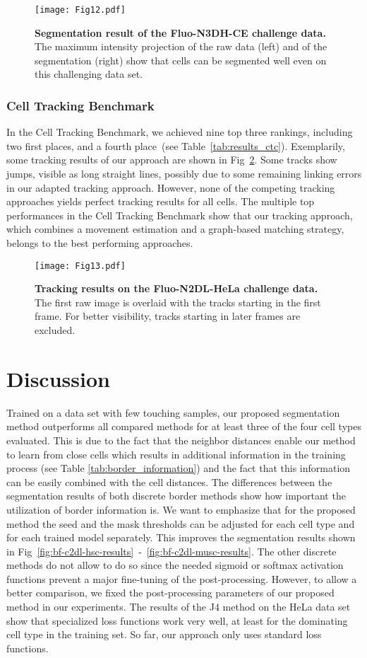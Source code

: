 \documentclass[10pt,letterpaper]{article}
\begin{document}
\begin{figure}
\centering
\texttt{[image: Fig12.pdf]}
\caption{\textbf{Segmentation result of the Fluo-N3DH-CE challenge data.} The maximum intensity projection of the raw data (left) and of the segmentation (right) show that cells can be segmented well even on this challenging data set.}
\label{fig:results-ce}
\end{figure}

\subsubsection*{Cell Tracking Benchmark}
In the Cell Tracking Benchmark, we achieved nine top three rankings, including two first places, and a fourth place~(see Table~\ref{tab:results_ctc}). Exemplarily, some tracking results of our approach are shown in Fig~\ref{fig:results-track-hela}. Some tracks show jumps, visible as long straight lines, possibly due to some remaining linking errors in our adapted tracking approach. However, none of the competing tracking approaches yields perfect tracking results for all cells. The multiple top performances in the Cell Tracking Benchmark show that our tracking approach, which combines a movement estimation and a graph-based matching strategy, belongs to the best performing approaches.
\begin{figure}
\centering
\texttt{[image: Fig13.pdf]}
\caption{\textbf{Tracking results on the Fluo-N2DL-HeLa challenge data.} The first raw image is overlaid with the tracks starting in the first frame. For better visibility, tracks starting in later frames are excluded.}
\label{fig:results-track-hela}
\end{figure}

\section*{Discussion}
Trained on a data set with few touching samples, our proposed segmentation method outperforms all compared methods for at least three of the four cell types evaluated. This is due to the fact that the neighbor distances enable our method to learn from close cells which results in additional information in the training process (see Table \ref{tab:border_information}) and the fact that this information can be easily combined with the cell distances. The differences between the segmentation results of both discrete border methods show how important the utilization of border information is. We want to emphasize that for the proposed method the seed and the mask thresholds can be adjusted for each cell type and for each trained model separately. This improves the segmentation results shown in Fig~\ref{fig:bf-c2dl-hsc-results}~-~\ref{fig:bf-c2dl-musc-results}. The other discrete methods do not allow to do so since the needed sigmoid or softmax activation functions prevent a major fine-tuning of the post-processing. However, to allow a better comparison, we fixed the post-processing parameters of our proposed method in our experiments. The results of the J4 method on the HeLa data set show that specialized loss functions work very well, at least for the dominating cell type in the training set. So far, our approach only uses standard loss functions.
\end{document}
